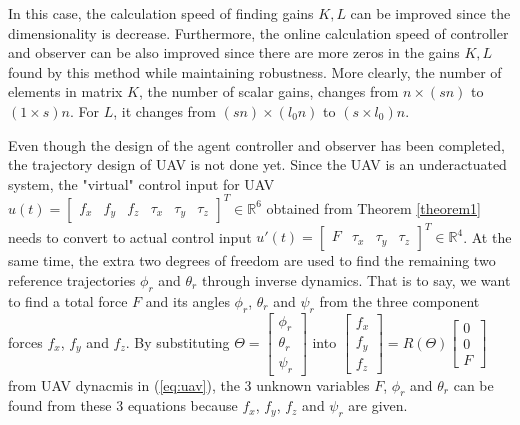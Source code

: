 \documentclass{ieeeaccess}
\newtheorem{remark}{Remark}
\begin{document}
In this case, the calculation speed of finding gains $K,L$ can be improved since the dimensionality is decrease. Furthermore, the online calculation speed of controller and observer can be also improved since there are more zeros in the gains $K,L$ found by this method while maintaining robustness. More clearly, the number of elements in matrix $K$, the number of scalar gains, changes from $n\times(sn)$ to $(1\times s)n$. For $L$, it changes from $(sn)\times(l_0n)$ to $(s\times l_0)n$.

Even though the design of the agent controller and observer has been completed, the trajectory design of UAV is not done yet. Since the UAV is an underactuated system, the "virtual" control input for UAV $u(t)=\begin{bmatrix}
    f_x & f_y & f_z & \tau_x & \tau_y & \tau_z 
\end{bmatrix}^T\in\mathbb{R}^6$ obtained from Theorem \ref{theorem1} needs to convert to actual control input $u'(t)=\begin{bmatrix}
    F & \tau_x & \tau_y & \tau_z 
\end{bmatrix}^T\in\mathbb{R}^4$. At the same time, the extra two degrees of freedom are used to find the remaining two reference trajectories $\phi_r$ and $\theta_r$ through inverse dynamics. That is to say, we want to find a total force $F$ and its angles $\phi_r$, $\theta_r$ and $\psi_r$ from the three component forces $f_x$, $f_y$ and $f_z$. By substituting $\Theta=\begin{bmatrix}
    \phi_r \\ \theta_r \\ \psi_r
\end{bmatrix}$ into $\begin{bmatrix}
        f_x \\ f_y \\ f_z
    \end{bmatrix} = R(\Theta)\begin{bmatrix}
        0 \\ 0 \\ F
\end{bmatrix} $ from UAV dynacmis in (\ref{eq:uav}), the 3 unknown variables $F$, $\phi_r$ and $\theta_r$ can be found from these 3 equations because $f_x$, $f_y$, $f_z$ and $\psi_r$ are given.
\end{document}
